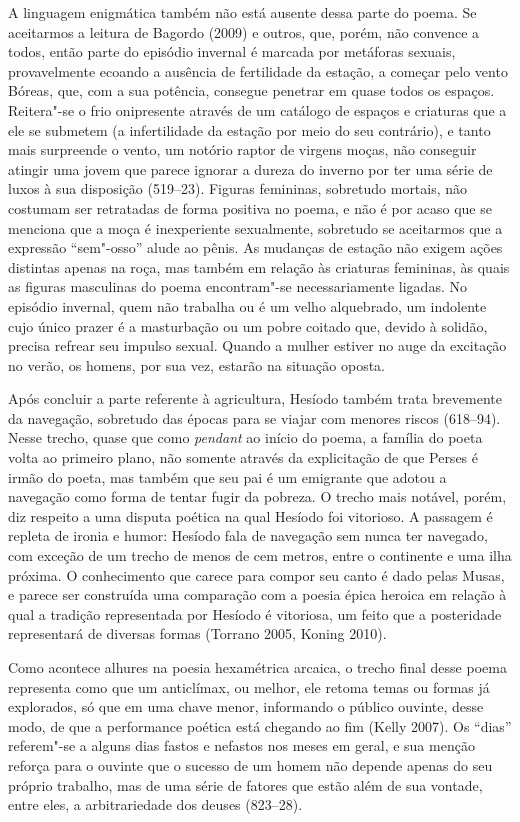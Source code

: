 A linguagem enigmática também não está ausente dessa parte do poema. Se
aceitarmos a leitura de Bagordo (2009) e outros, que, porém, não
convence a todos, então parte do episódio invernal é marcada por
metáforas sexuais, provavelmente ecoando a ausência de fertilidade da
estação, a começar pelo vento Bóreas, que, com a sua potência, consegue
penetrar em quase todos os espaços. Reitera"-se o frio onipresente
através de um catálogo de espaços e criaturas que a ele se submetem (a
infertilidade da estação por meio do seu contrário), e tanto mais
surpreende o vento, um notório raptor de virgens moças, não conseguir
atingir uma jovem que parece ignorar a dureza do inverno por ter uma
série de luxos à sua disposição (519--23). Figuras femininas, sobretudo
mortais, não costumam ser retratadas de forma positiva no poema, e não é
por acaso que se menciona que a moça é inexperiente sexualmente,
sobretudo se aceitarmos que a expressão ``sem"-osso'' alude ao pênis. As
mudanças de estação não exigem ações distintas apenas na roça, mas
também em relação às criaturas femininas, às quais as figuras masculinas
do poema encontram"-se necessariamente ligadas. No episódio invernal,
quem não trabalha ou é um velho alquebrado, um indolente cujo único
prazer é a masturbação ou um pobre coitado que, devido à solidão,
precisa refrear seu impulso sexual. Quando a mulher estiver no auge da
excitação no verão, os homens, por sua vez, estarão na situação oposta.

Após concluir a parte referente à agricultura, Hesíodo também trata
brevemente da navegação, sobretudo das épocas para se viajar com menores
riscos (618--94). Nesse trecho, quase que como \emph{pendant} ao início
do poema, a família do poeta volta ao primeiro plano, não somente
através da explicitação de que Perses é irmão do poeta, mas também que
seu pai é um emigrante que adotou a navegação como forma de tentar fugir
da pobreza. O trecho mais notável, porém, diz respeito a uma disputa
poética na qual Hesíodo foi vitorioso. A passagem é repleta de ironia e
humor: Hesíodo fala de navegação sem nunca ter navegado, com exceção de
um trecho de menos de cem metros, entre o continente e uma ilha próxima.
O conhecimento que carece para compor seu canto é dado pelas Musas, e
parece ser construída uma comparação com a poesia épica heroica em
relação à qual a tradição representada por Hesíodo é vitoriosa, um feito
que a posteridade representará de diversas formas (Torrano 2005, Koning
2010).

Como acontece alhures na poesia hexamétrica arcaica, o trecho final
desse poema representa como que um anticlímax, ou melhor, ele retoma
temas ou formas já explorados, só que em uma chave menor, informando o
público ouvinte, desse modo, de que a performance poética está chegando
ao fim (Kelly 2007). Os ``dias'' referem"-se a alguns dias fastos e
nefastos nos meses em geral, e sua menção reforça para o ouvinte que o
sucesso de um homem não depende apenas do seu próprio trabalho, mas de
uma série de fatores que estão além de sua vontade, entre eles, a
arbitrariedade dos deuses (823--28).

